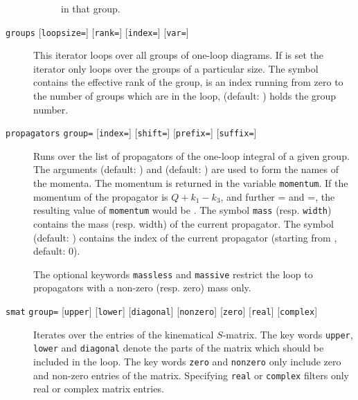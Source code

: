 \documentclass[11pt,a4paper]{refrep}
\begin{document}
\begin{description}
\begin{description}
         in that group.
   \end{description}
\item[\texttt{groups}
   {[\texttt{loopsize=}\synt{size}]}
   {[\texttt{rank=}\synt{rank}]}
   {[\texttt{index=}\synt{index}]}
   {[\texttt{var=}\synt{var}]}]
   This iterator loops over all groups of one-loop diagrams. If
    is set the iterator only loops over the groups of
   a particular size. The symbol  contains the effective
   rank of the group,  is an index running from zero to
   the number of groups which are in the loop, 
   (default: \lit{\$\_}) holds the group number.
\item[\texttt{propagators} \texttt{group=}\synt{group}
   {[\texttt{index=}\synt{index}]}
   {[\texttt{shift=}\synt{shift}]}
   {[\texttt{prefix=}\synt{prefix}]}
   {[\texttt{suffix=}\synt{suffix}]}]
   Runs over the list of propagators of the one-loop integral of a
   given group. The arguments  (default: )
   and  (default: \lit{}) are used to form the
   names of the momenta. The momentum is returned in the
   variable \texttt{momentum}. If the momentum of the propagator
   is $Q+k_1-k_3$, and further = and
   =\lit{,:)}, the resulting value of \texttt{momentum}
   would be . The symbol \texttt{mass} (resp.
   \texttt{width})
   contains the mass (resp. width) of the current propagator. The symbol
    (default: \lit{\$\_}) contains the index of the current
   propagator (starting from , default: 0).

   The optional keywords \texttt{massless} and \texttt{massive}
   restrict the loop to propagators with a non-zero (resp. zero)
   mass only.
\item[\texttt{smat} \texttt{group=}\synt{group}
   {[\texttt{upper}]} {[\texttt{lower}]} {[\texttt{diagonal}]}
   {[\texttt{nonzero}]} {[\texttt{zero}]} {[\texttt{real}]}
   {[\texttt{complex}]}]
   Iterates over the entries of the kinematical $S$-matrix.
   The key words \texttt{upper}, \texttt{lower} and \texttt{diagonal}
   denote the parts of the matrix which should be included in the loop.
   The key words \texttt{zero} and \texttt{nonzero} only include
   zero and non-zero entries of the matrix.
   Specifying \texttt{real} or \texttt{complex} filters only
   real or complex matrix entries.


\end{description}
\end{document}
